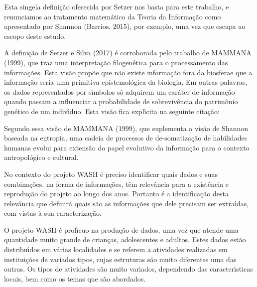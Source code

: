 \documentclass[
12pt,		%
openright,	%
twoside,  %
a4paper,			%
chapter=TITLE,		%
english,			%
french,				%
spanish,			%
brazil				%
]{USPSC-classe/USPSC}
\begin{document}
Esta singela defini\c{c}\~ao oferecida por Setzer nos basta para este trabalho, e renunciamos ao tratamento matem\'atico da Teoria da Informa\c{c}\~ao como apresentado por Shannon (Barrios, 2015), por exemplo, uma vez que escapa ao escopo deste estudo.


A defini\c{c}\~ao de Setzer e Silva (2017) \'e corroborada pelo trabalho de MAMMANA (1999), que traz uma interpreta\c{c}\~ao filogen\'etica para o processamento das informa\c{c}\~oes. Esta vis\~ao prop\~oe que \textquotedbl n\~ao existe informa\c{c}\~ao fora da biosfera\textquotedbl  e que a informa\c{c}\~ao seria uma primitiva epistemol\'ogica da biologia. Em outras palavras, os dados representados por s\'{\i}mbolos s\'o adquirem um car\'ater de informa\c{c}\~ao quando passam a influenciar a probabilidade de sobreviv\^encia do patrim\^onio gen\'etico de um indiv\'{\i}duo. Esta vis\~ao fica expl\'{\i}cita na seguinte cita\c{c}\~ao:



\noindent\begin{center}\mbox{\centering{}}\end{center}


Segundo essa vis\~ao de  MAMMANA (1999), que suplementa a vis\~ao de Shannon baseada na entropia, uma cadeia de processos de de-somatiza\c{c}\~ao de habilidades humanas evolui para extens\~ao do papel evolutivo da informa\c{c}\~ao para o contexto antropol\'ogico e cultural.


No contexto do projeto WASH \'e preciso identificar quais dados e suas combina\c{c}\~oes, na forma de informa\c{c}\~oes, t\^em relev\^ancia para a exist\^encia e reprodu\c{c}\~ao do projeto ao longo dos anos. Portanto \'e a identifica\c{c}\~ao desta relev\^ancia que definir\'a quais s\~ao as informa\c{c}\~oes que dele precisam ser extra\'{\i}das, com vistas \`a sua caracteriza\c{c}\~ao.


O projeto WASH \'e prof\'{\i}cuo na produ\c{c}\~ao de dados, uma vez que atende uma quantidade muito grande de crian\c{c}as, adolescentes e adultos. Estes dados est\~ao distribu\'{\i}dos em v\'arias localidades e se referem a atividades realizadas em institui\c{c}\~oes de variados tipos, cujas estruturas s\~ao muito diferentes uma das outras. Os tipos de atividades s\~ao muito variados, dependendo das caracter\'{\i}sticas locais, bem como os temas que s\~ao abordados.
\end{document}
